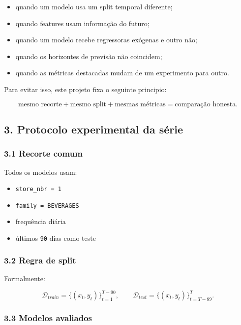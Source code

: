 \documentclass[12pt]{article}
\providecommand{\tightlist}{%
          \setlength{\itemsep}{0pt}\setlength{\parskip}{0pt}}
\begin{document}
\begin{itemize}
\tightlist
\item
  quando um modelo usa um split temporal diferente;
\item
  quando features usam informação do futuro;
\item
  quando um modelo recebe regressoras exógenas e outro não;
\item
  quando os horizontes de previsão não coincidem;
\item
  quando as métricas destacadas mudam de um experimento para outro.
\end{itemize}

Para evitar isso, este projeto fixa o seguinte principio:

\[
\text{mesmo recorte} + \text{mesmo split} + \text{mesmas métricas} = \text{comparação honesta}.
\]

\subsection{3. Protocolo experimental da série}\label{3-protocolo-experimental-da-suxe9rie}

\subsubsection{3.1 Recorte comum}\label{31-recorte-comum}

Todos os modelos usam:

\begin{itemize}
\tightlist
\item
  \texttt{store\_nbr\ =\ 1}
\item
  \texttt{family\ =\ BEVERAGES}
\item
  frequência diária
\item
  últimos \texttt{90} dias como teste
\end{itemize}

\subsubsection{3.2 Regra de split}\label{32-regra-de-split}

Formalmente:

\[
\mathcal{D}_{train} = \{(x_t, y_t)\}_{t=1}^{T-90},
\qquad
\mathcal{D}_{test} = \{(x_t, y_t)\}_{t=T-89}^T.
\]

\subsubsection{3.3 Modelos avaliados}\label{33-modelos-avaliados}
\end{document}
